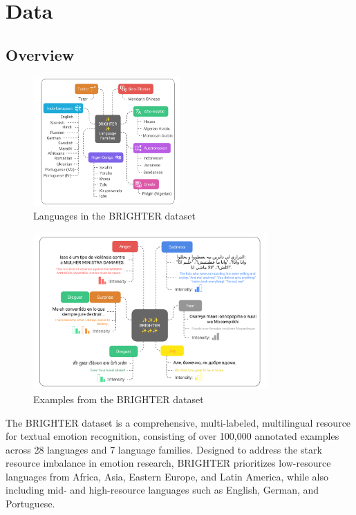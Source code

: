 \documentclass[a4paper,12pt]{extarticle}
\begin{document}
\section{Data}
\subsection{Overview}

\begin{figure}[h]
    \centering
    \includegraphics[width=0.5\textwidth]{brighter_languages.png}
    \caption{Languages in the BRIGHTER dataset}
    \label{fig:brighter_languages}
\end{figure}

\begin{figure}[h]
    \centering
    \includegraphics[width=0.8\textwidth]{brighter_examples.png}
    \caption{Examples from the BRIGHTER dataset}
    \label{fig:brighter_examples}
\end{figure}

The BRIGHTER dataset \cite{muhammad2025brighterbridginggaphumanannotated} is a comprehensive, multi-labeled, multilingual resource for textual emotion recognition, consisting of over 100,000 annotated examples across 28 languages and 7 language families. Designed to address the stark resource imbalance in emotion research, BRIGHTER prioritizes low-resource languages from Africa, Asia, Eastern Europe, and Latin America, while also including mid- and high-resource languages such as English, German, and Portuguese.
\end{document}
